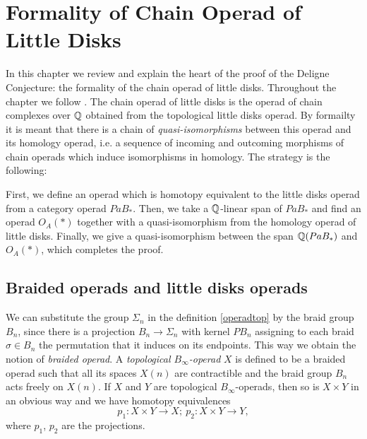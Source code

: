 \documentclass[TFM.tex]{subfiles}
\begin{document}
\chapter{Formality of Chain Operad of Little Disks}\label{4}



%
%
%


In this chapter we review and explain the heart of the proof of the Deligne Conjecture: the formality of the chain operad of little disks. Throughout the chapter we follow \cite{Tamarkin}. The chain operad of little disks is the operad of chain complexes over $\mathbb{Q}$ obtained from the topological little disks operad. By formailty it is meant that there is a chain of \emph{quasi-isomorphisms} between this operad and its homology operad, i.e. a sequence of incoming and outcoming morphisms of chain operads which induce isomorphisms in homology. The strategy is the following:

 First, we define an operad which is homotopy equivalent to the little disks operad from a category operad $PaB_*$. Then, we take a $\mathbb{Q}$-linear span of $PaB_*$ and find an operad $O_A(*)$ together with a quasi-isomorphism from the homology operad of little disks. Finally, we give a quasi-isomorphism between the span $\mathbb{Q}(PaB_*)$ and $O_A(*)$, which completes the proof. 




\section{Braided operads and little disks operads}

We can substitute the group $\Sigma_n$ in the definition \ref{operadtop} by the braid group $B_n$, since there is a projection $B_n\to \Sigma_n$ with kernel $PB_n$ assigning to each braid $\sigma\in B_n$ the permutation that it induces on its endpoints. This way we obtain the notion of \emph{braided operad}. A \emph{topological $B_\infty$-operad} $X$ is defined to be a braided operad such that all its spaces $X(n)$ are contractible and the braid group $B_n$ acts freely on $X(n)$. If $X$ and $Y$ are topological $B_\infty$-operads, then so is $X\times Y$ in an obvious way and we have homotopy equivalences 
\begin{equation}\label{projections}
p_1:X\times Y\to X;\ p_2:X\times Y\to Y,
\end{equation}
where $p_1$, $p_2$ are the projections. 
\end{document}
